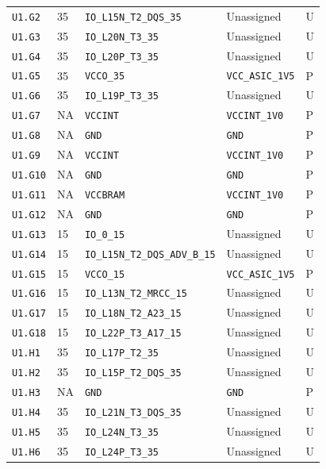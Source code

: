 \documentclass[11pt,a4paper]{article}
\begin{document}
\begin{longtable}{@{}P{20mm}P{10mm}P{70mm}P{51mm}P{11mm}@{}}
\nolinkurl{U1.G2} & 35 & \nolinkurl{IO_L15N_T2_DQS_35} & Unassigned & U \\
\nolinkurl{U1.G3} & 35 & \nolinkurl{IO_L20N_T3_35} & Unassigned & U \\
\nolinkurl{U1.G4} & 35 & \nolinkurl{IO_L20P_T3_35} & Unassigned & U \\
\nolinkurl{U1.G5} & 35 & \nolinkurl{VCCO_35} & \nolinkurl{VCC_ASIC_1V5} & P \\
\nolinkurl{U1.G6} & 35 & \nolinkurl{IO_L19P_T3_35} & Unassigned & U \\
\nolinkurl{U1.G7} & NA & \nolinkurl{VCCINT} & \nolinkurl{VCCINT_1V0} & P \\
\nolinkurl{U1.G8} & NA & \nolinkurl{GND} & \nolinkurl{GND} & P \\
\nolinkurl{U1.G9} & NA & \nolinkurl{VCCINT} & \nolinkurl{VCCINT_1V0} & P \\
\nolinkurl{U1.G10} & NA & \nolinkurl{GND} & \nolinkurl{GND} & P \\
\nolinkurl{U1.G11} & NA & \nolinkurl{VCCBRAM} & \nolinkurl{VCCINT_1V0} & P \\
\nolinkurl{U1.G12} & NA & \nolinkurl{GND} & \nolinkurl{GND} & P \\
\nolinkurl{U1.G13} & 15 & \nolinkurl{IO_0_15} & Unassigned & U \\
\nolinkurl{U1.G14} & 15 & \nolinkurl{IO_L15N_T2_DQS_ADV_B_15} & Unassigned & U \\
\nolinkurl{U1.G15} & 15 & \nolinkurl{VCCO_15} & \nolinkurl{VCC_ASIC_1V5} & P \\
\nolinkurl{U1.G16} & 15 & \nolinkurl{IO_L13N_T2_MRCC_15} & Unassigned & U \\
\nolinkurl{U1.G17} & 15 & \nolinkurl{IO_L18N_T2_A23_15} & Unassigned & U \\
\nolinkurl{U1.G18} & 15 & \nolinkurl{IO_L22P_T3_A17_15} & Unassigned & U \\
\nolinkurl{U1.H1} & 35 & \nolinkurl{IO_L17P_T2_35} & Unassigned & U \\
\nolinkurl{U1.H2} & 35 & \nolinkurl{IO_L15P_T2_DQS_35} & Unassigned & U \\
\nolinkurl{U1.H3} & NA & \nolinkurl{GND} & \nolinkurl{GND} & P \\
\nolinkurl{U1.H4} & 35 & \nolinkurl{IO_L21N_T3_DQS_35} & Unassigned & U \\
\nolinkurl{U1.H5} & 35 & \nolinkurl{IO_L24N_T3_35} & Unassigned & U \\
\nolinkurl{U1.H6} & 35 & \nolinkurl{IO_L24P_T3_35} & Unassigned & U \\

\end{longtable}
\end{document}
